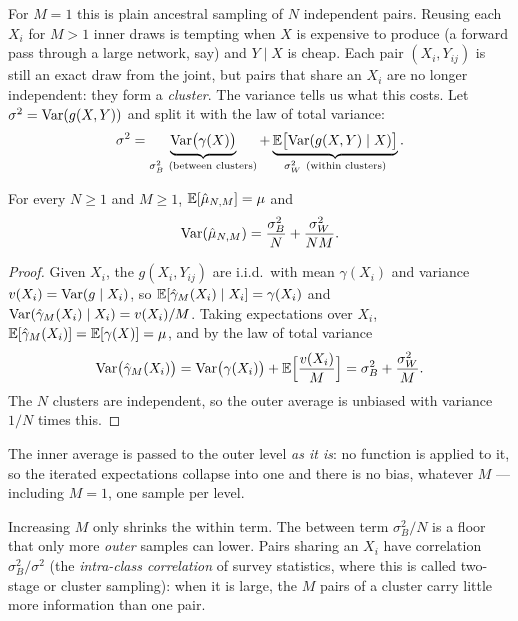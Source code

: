 \begin{notechapter}
For $M = 1$ this is plain ancestral sampling of $N$ independent pairs. Reusing each
$X_i$ for $M>1$ inner draws is tempting when $X$ is expensive to produce (a forward
pass through a large network, say) and $Y\mid X$ is cheap. Each pair $(X_i,Y_{ij})$
is still an exact draw from the joint, but pairs that share an $X_i$ are no longer
independent: they form a \emph{cluster}. The variance tells us what this costs. Let
$\sigma^2 = \operatorname{Var}(g(X,Y))$ and split it with the law of total variance:
\[
  \sigma^2 = \underbrace{\Var\bigl(\gamma(X)\bigr)}_{\sigma_B^2\ \text{(between clusters)}}
  + \underbrace{\E\bigl[\Var(g(X,Y)\mid X)\bigr]}_{\sigma_W^2\ \text{(within clusters)}} .
\]

\begin{proposition}\label{monte-carlo:prop:two-stage}
For every $N\geq1$ and $M\geq1$, $\mathbb{E}[\hat\mu_{N,M}] = \mu$ and
\[
  \operatorname{Var}(\hat\mu_{N,M}) = \frac{\sigma_B^2}N + \frac{\sigma_W^2}{NM} .
\]
\end{proposition}

\begin{proof}
Given $X_i$, the $g(X_i,Y_{ij})$ are i.i.d.\ with mean $\gamma(X_i)$ and variance
$v(X_i) = \operatorname{Var}(g\mid X_i)$, so $\mathbb{E}[\hat\gamma_M(X_i)\mid X_i] = \gamma(X_i)$ and
$\operatorname{Var}(\hat\gamma_M(X_i)\mid X_i) = v(X_i)/M$. Taking expectations over $X_i$,
$\mathbb{E}[\hat\gamma_M(X_i)] = \mathbb{E}[\gamma(X)] = \mu$, and by the law of total variance
\[
  \operatorname{Var}\bigl(\hat\gamma_M(X_i)\bigr) = \operatorname{Var}\bigl(\gamma(X_i)\bigr) + \mathbb{E}\Bigl[\frac{v(X_i)}M\Bigr]
  = \sigma_B^2 + \frac{\sigma_W^2}M .
\]
The $N$ clusters are independent, so the outer average is unbiased with variance
$1/N$ times this.
\end{proof}

The inner average is passed to the outer level \emph{as it is}: no function is
applied to it, so the iterated expectations collapse into one and there is no bias,
whatever $M$ --- including $M = 1$, one sample per level.

\begin{intuition}
Increasing $M$ only shrinks the within term. The between term $\sigma_B^2/N$ is a
floor that only more \emph{outer} samples can lower. Pairs sharing an $X_i$ have
correlation $\sigma_B^2/\sigma^2$ (the \emph{intra-class correlation} of survey
statistics, where this is called two-stage or cluster sampling): when it is large,
the $M$ pairs of a cluster carry little more information than one pair.
\end{intuition}


\end{notechapter}
